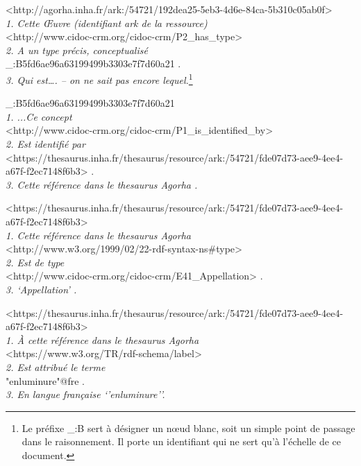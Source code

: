 \documentclass[a4paper,12pt, twoside]{book}
\begin{document}
\begin{center}
\textsf{\textcolor{urlblue}{<http://agorha.inha.fr/ark:/54721/192dea25-5eb3-4d6e-84ca-5b310c05ab0f>}}\\
\textit{1. Cette Œuvre (identifiant ark de la ressource)}\\
\textsf{\textcolor{urlblue}{<http://www.cidoc-crm.org/cidoc-crm/P2\_has\_type>}}\\
\textit{2. A un type précis, conceptualisé}\\
\textsf{\textcolor{urlblue}{\_:B5fd6ae96a63199499b3303e7f7d60a21 .}}\\
\textit{3. Qui est…. – on ne sait pas encore lequel.}\footnote{Le préfixe \textsf{\_:B} sert à désigner un nœud blanc, soit un simple point de passage dans le raisonnement. Il porte un identifiant qui ne sert qu’à l’échelle de ce document.}\\

\medskip

\textsf{\textcolor{urlblue}{\_:B5fd6ae96a63199499b3303e7f7d60a21}}\\
\textit{1. ...Ce concept}\\
\textsf{\textcolor{urlblue}{<http://www.cidoc-crm.org/cidoc-crm/P1\_is\_identified\_by>}}\\
\textit{2. Est identifié par}\\
\textsf{\textcolor{urlblue}{<https://thesaurus.inha.fr/thesaurus/resource/ark:/54721/fde07d73-aee9-4ee4-a67f-f2ec7148f6b3> .}}\\
\textit{3. Cette référence dans le thesaurus Agorha .}\\

\medskip

\textsf{\textcolor{urlblue}{<https://thesaurus.inha.fr/thesaurus/resource/ark:/54721/fde07d73-aee9-4ee4-a67f-f2ec7148f6b3>}}\\
\textit{1. Cette référence dans le thesaurus Agorha}\\
\textsf{\textcolor{urlblue}{<http://www.w3.org/1999/02/22-rdf-syntax-ns\#type>}}\\
\textit{2. Est de type}\\
\textsf{\textcolor{urlblue}{<http://www.cidoc-crm.org/cidoc-crm/E41\_Appellation> .}}\\
\textit{3. ‘Appellation’ .}\\

\medskip

\textsf{\textcolor{urlblue}{<https://thesaurus.inha.fr/thesaurus/resource/ark:/54721/fde07d73-aee9-4ee4-a67f-f2ec7148f6b3>}}\\
\textit{1. À cette référence dans le thesaurus Agorha}\\
\textsf{\textcolor{urlblue}{<https://www.w3.org/TR/rdf-schema/label>}}\\
\textit{2. Est attribué le terme}\\
\textsf{\textcolor{urlblue}{"enluminure"@fre .}}\\
\textit{3. En langue française ‘’enluminure’’.}\\
\end{center}
\end{document}
